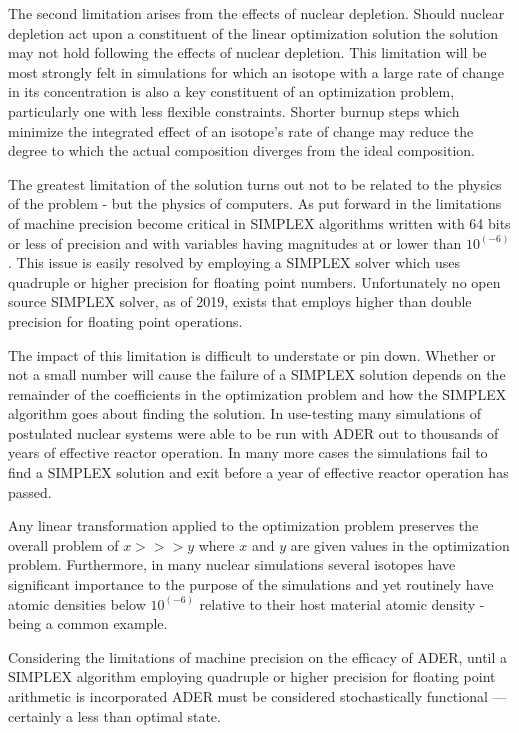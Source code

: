 The second limitation arises from the effects of nuclear depletion. Should
nuclear depletion act upon a constituent of the linear optimization solution
the solution may not hold following the effects of nuclear depletion. This
limitation will be most strongly felt in simulations for which an isotope
with a large rate of change in its concentration is also a key constituent of
an optimization problem, particularly one with less flexible constraints. 
Shorter
burnup steps which minimize the integrated effect of an isotope's rate of change
may reduce the degree to which the actual composition diverges from the ideal
composition.

The greatest limitation of the solution turns out not to be related to the
physics of the problem - but the physics of computers. As put forward in 
\cite{STANFORD} the limitations of machine precision become critical in
SIMPLEX algorithms written with 64 bits or less of precision and with
variables having magnitudes at or lower than $10^(-6)$. This issue is easily
resolved by employing a SIMPLEX solver which uses quadruple or higher precision
for floating point numbers. Unfortunately no open source SIMPLEX solver, as of
2019, exists that employs higher than double precision for floating point
operations.

The impact of this limitation is difficult to understate or pin down. Whether or
not a small number will cause the failure of a SIMPLEX solution depends on the
remainder of the coefficients in the optimization problem and how the SIMPLEX
algorithm goes about finding the solution. In use-testing many simulations of
postulated nuclear systems were able to be run with ADER out to thousands of
years of effective reactor operation. In many more cases the simulations fail
to find a SIMPLEX solution and exit before a year of effective reactor
operation has passed.

Any linear transformation applied to the optimization problem preserves the
overall problem of $x >>> y$ where $x$ and $y$ are given values in the
optimization problem. Furthermore, in many nuclear simulations several isotopes
have significant importance to the purpose of the simulations and yet routinely
have atomic densities below $10^(-6)$ relative to their host material atomic
density -  being a common example.

Considering the limitations of machine precision on the efficacy of ADER, until
a SIMPLEX algorithm employing quadruple or higher precision for floating point
arithmetic is incorporated ADER must be considered stochastically functional
--- certainly a less than optimal state. 


